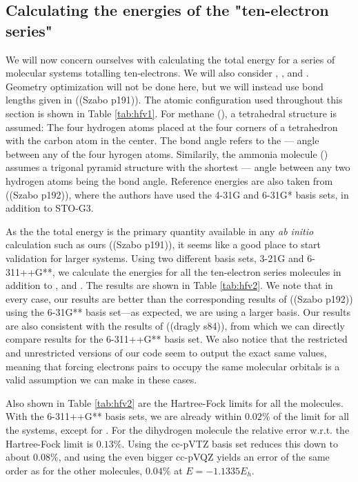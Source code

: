 \documentclass[a4paper]{article}
\newcommand{\tab}[1]{Table \ref{tab:#1}}
\begin{document}
\subsection{Calculating the energies of the "ten-electron series"}
We will now concern ourselves with calculating the total energy for a series of molecular systems totalling ten-electrons. We will also consider , , and . Geometry optimization will not be done here, but we will instead use bond lengths given in ((Szabo p191)). The atomic configuration used throughout this section is shown in \tab{hfv1}. For methane (), a tetrahedral structure is assumed: The four hydrogen atoms placed at the four corners of a tetrahedron with the carbon atom in the center. The bond angle refers to the \---\--- angle between any of the four hyrogen atoms. Similarily, the ammonia molecule () assumes a trigonal pyramid structure with the shortest \---\--- angle between any two hydrogen atoms being the bond angle. Reference energies are also taken from ((Szabo p192)), where the authors have used the 4-31G and 6-31G* basis sets, in addition to STO-G3. 

As the the total energy is the primary quantity available in any \emph{ab initio} calculation such as ours ((Szabo p191)), it seems like a good place to start validation for larger systems. Using two different basis sets, 3-21G and 6-311++G**, we calculate the energies for all the ten-electron series molecules in addition to ,  and . The results are shown in \tab{hfv2}. We note that in every case, our results are better than the corresponding results of ((Szabo p192)) using the 6-31G** basis set\----as expected, we are using a larger basis. Our results are also consistent with the results of ((dragly s84)), from which we can directly compare results for the 6-311++G** basis set. We also notice that the restricted and unrestricted versions of our code seem to output the exact same values, meaning that forcing electrons pairs to occupy the same molecular orbitals is a valid assumption we can make in these cases.

Also shown in \tab{hfv2} are the Hartree-Fock limits for all the molecules. With the 6-311++G** basis sets, we are already within $0.02\%$ of the limit for all the systems, except for . For the dihydrogen molecule the relative error w.r.t. the Hartree-Fock limit is $0.13\%$. Using the cc-pVTZ basis set reduces this down to about $0.08\%$, and using the even bigger cc-pVQZ yields an error of the same order as for the other molecules, $0.04\%$ at $E=-1.1335E_h$.
\end{document}
